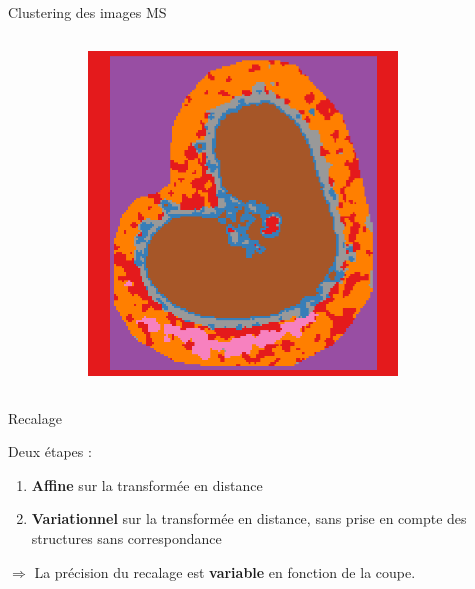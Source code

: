 \documentclass[10pt]{beamer}
\begin{document}
\begin{frame}{Clustering des images MS}
\begin{columns}
\begin{column}{.3\textwidth}
\begin{figure}[ht]
\begin{subfigure}[t]{0.99\textwidth}
          \includegraphics[width=0.9\textwidth]{fig/clustering_250Lich_s6.png}
          \caption{}
          \label{subfig:clustering_250Lich_s6.png}
        \end{subfigure}%

      \end{figure}

    \end{column}
  \end{columns}


\end{frame}

\begin{frame}{Recalage}

  Deux étapes :
  \begin{enumerate}
  \item \textbf{Affine} sur la transformée en distance
  \item \textbf{Variationnel} sur la transformée en distance, sans prise en compte des structures sans correspondance
  \end{enumerate}

  $\Rightarrow$ La précision du recalage est \textbf{variable} en fonction de la coupe.
\end{frame}
\end{document}
